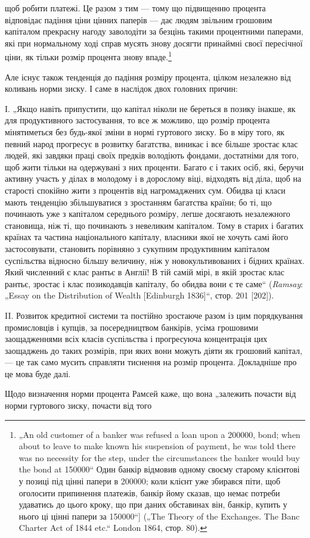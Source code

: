 \parcont{}  %
щоб робити платежі. Це разом з тим — тому що підвищенню процента
відповідає падіння ціни цінних паперів — дає людям звільним
грошовим капіталом прекрасну нагоду заволодіти за безцінь
такими процентними паперами, які при нормальному ході справ
мусять знову досягти принаймні своєї пересічної ціни, як тільки
розмір процента знову впаде.\footnote{
„An old customer of a banker was refused a loan upon a \num{200000}, bond;
when about to leave to make known his suspension of payment, he was told
there was no necessity for the step, under the circumstances the banker would buy
the bond at \num{150000}“ Один банкір відмовив одному своєму старому клієнтові
у позиці під цінні папери в \num{200000}; коли клієнт уже збирався
піти, щоб оголосити припинення платежів, банкір йому сказав, що немає потреби
удаватись до цього кроку, що при даних обставинах він, банкір, купить
у нього ці цінні папери за \num{150000}“] („The Theory of the Exchanges.
The Banc Charter Act of 1844 etc.“ London 1864, стор. 80).
}

Але існує також тенденція до падіння розміру процента, цілком
незалежно від коливань норми зиску. І саме в наслідок
двох головних причин:

I. „Якщо навіть припустити, що капітал ніколи не береться
в позику інакше, як для продуктивного застосування, то все ж
можливо, що розмір процента мінятиметься без будь-якої зміни
в нормі гуртового зиску. Бо в міру того, як певний народ прогресує
в розвитку багатства, виникає і все більше зростає клас
людей, які завдяки праці своїх предків володіють фондами, достатніми
для того, щоб жити тільки на одержувані з них проценти.
Багато є і таких осіб, які, беручи активну участь у ділах в молодому
і в дорослому віці, відходять від діла, щоб на старості
спокійно жити з процентів від нагромаджених сум. Обидва ці
класи мають тенденцію збільшуватися з зростанням багатства
країни; бо ті, що починають уже з капіталом середнього розміру,
легше досягають незалежного становища, ніж ті, що починають
з невеликим капіталом. Тому в старих і багатих країнах
та частина національного капіталу, власники якої не хочуть самі
його застосовувати, становить порівняно з сукупним продуктивним
капіталом суспільства відносно більшу величину, ніж
у новокультивованих і бідних країнах. Який численний є клас
рантьє в Англії! В тій самій мірі, в якій зростає клас рантьє,
зростає і клас позикодавців капіталу, бо обидва вони є те саме“
(\emph{Ramsay}: „Essay on the Distribution of Wealth [Edinburgh 1836]“,
стор. 201 [202]).

II. Розвиток кредитної системи та постійно зростаюче разом
із цим порядкування промисловців і купців, за посередництвом
банкірів, усіма грошовими заощадженнями всіх класів суспільства
і прогресуюча концентрація цих заощаджень до таких розмірів,
при яких вони можуть діяти як грошовий капітал, — це
так само мусить справляти тиснення на розмір процента.
Докладніше про це мова буде далі.

Щодо визначення норми процента Рамсей каже, що вона „залежить
почасти від норми гуртового зиску, почасти від того
\parbreak{}  %
